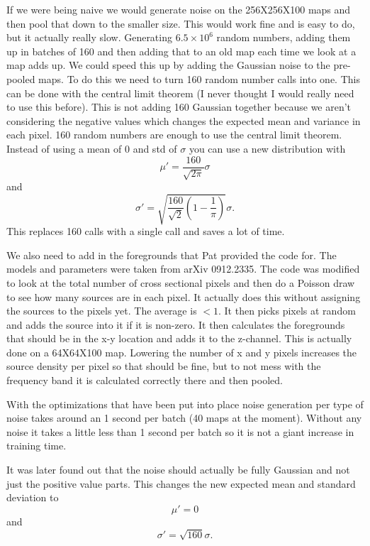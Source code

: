 \documentclass{article}
\begin{document}
		If we were being naive we would generate noise on the 256X256X100 maps and then pool that down to the smaller size.  This would work fine and is easy to do, but it actually really slow.  Generating \(6.5 \times 10^{6}\) random numbers, adding them up in batches of 160 and then adding that to an old map each time we look at a map adds up.  We could speed this up by adding the Gaussian noise to the pre-pooled maps.  To do this we need to turn 160 random number calls into one.  This can be done with the central limit theorem (I never thought I would really need to use this before).  This is not adding 160 Gaussian together because we aren't considering the negative values which changes the expected mean and variance in each pixel.  160 random numbers are enough to use the central limit theorem.  Instead of using a mean of 0 and std of \(\sigma\) you can use a new distribution with 
		\begin{equation}
			\mu' = \frac{160}{\sqrt{2 \pi}} \sigma
		\end{equation}
		and
		\begin{equation}
			\sigma' = \sqrt{\frac{160}{\sqrt{2}} (1 - \frac{1}{\pi})} \sigma.
		\end{equation}
		This replaces 160 calls with a single call and saves a lot of time.

		We also need to add in the foregrounds that Pat provided the code for.  The models and parameters were taken from arXiv 0912.2335.  The code was modified to look at the total number of cross sectional pixels and then do a Poisson draw to see how many sources are in each pixel.  It actually does this without assigning the sources to the pixels yet.  The average is \(< 1\).  It then picks pixels at random and adds the source into it if it is non-zero.  It then calculates the foregrounds that should be in the x-y location and adds it to the z-channel.  This is actually done on a 64X64X100 map.  Lowering the number of x and y pixels increases the source density per pixel so that should be fine, but to not mess with the frequency band it is calculated correctly there and then pooled.  

		With the optimizations that have been put into place noise generation per type of noise takes around an 1 second per batch (40 maps at the moment).  Without any noise it takes a little less than 1 second per batch so it is not a giant increase in training time.

		It was later found out that the noise should actually be fully Gaussian and not just the positive value parts.  This changes the new expected mean and standard deviation to
		\begin{equation}
			\mu' = 0
		\end{equation}
		and
		\begin{equation}
			\sigma' = \sqrt{160}\sigma.
		\end{equation}
\end{document}
